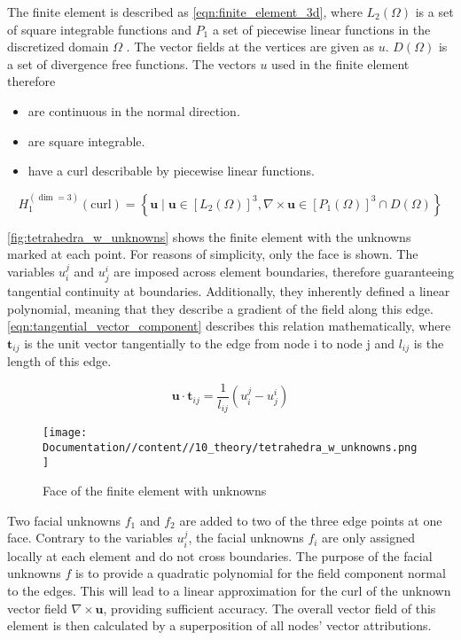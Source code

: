 The finite element is described as \autoref{eqn:finite_element_3d}, where $L_2(\Omega)$ is a set of square integrable functions and $P_1$ a set of piecewise linear functions in the discretized domain $\Omega$ \cite{104986}. The vector fields at the vertices are given as $u$. $D(\Omega)$ is a set of divergence free functions. The vectors $u$ used in the finite element therefore 

\begin{itemize}
    \item are continuous in the normal direction.
    \item are square integrable.
    \item have a curl describable by piecewise linear functions.
\end{itemize}

\begin{equation}
    H^{(\dim=3)}_1(\mathrm{curl}) = \left\{ \mathbf{u} \mid \mathbf{u} \in \left[ L_2(\Omega) \right]^3, \nabla \times \mathbf{u} \in \left[ P_1(\Omega) \right]^3 \cap D(\Omega) \right\}
    \label{eqn:finite_element_3d}
\end{equation}

\autoref{fig:tetrahedra_w_unknowns} shows the finite element with the unknowns marked at each point. For reasons of simplicity, only the face is shown. The variables $u_i^j$ and $u_j^i$ are imposed across element boundaries, therefore guaranteeing tangential continuity at boundaries. Additionally, they inherently defined a linear polynomial, meaning that they describe a gradient of the field along this edge. \autoref{eqn:tangential_vector_component} describes this relation mathematically, where $\mathbf{t}_{ij}$ is the unit vector tangentially to the edge from node i to node j and $l_{ij}$ is the length of this edge.

\begin{equation}
    \mathbf{u}\cdot\mathbf{t}_{ij}=\frac{1}{l_{ij}}\left( u_i^j-u_j^i \right)
    \label{eqn:tangential_vector_component}
\end{equation}

\begin{figure}[h]
    \centering
    \texttt{[image: Documentation//content//10\_theory/tetrahedra\_w\_unknowns.png]}
    \caption{Face of the finite element with unknowns}
    \label{fig:tetrahedra_w_unknowns}
\end{figure}

Two facial unknowns $f_1$ and $f_2$ are added to two of the three edge points at one face. Contrary to the variables $u_i^j$, the facial unknowns $f_i$ are only assigned locally at each element and do not cross boundaries. The purpose of the facial unknowns $f$ is to provide a quadratic polynomial for the field component normal to the edges. This will lead to a linear approximation for the curl of the unknown vector field $\nabla\times \mathbf{u}$, providing sufficient accuracy. The overall vector field of this element is then calculated by a superposition of all nodes' vector attributions.

